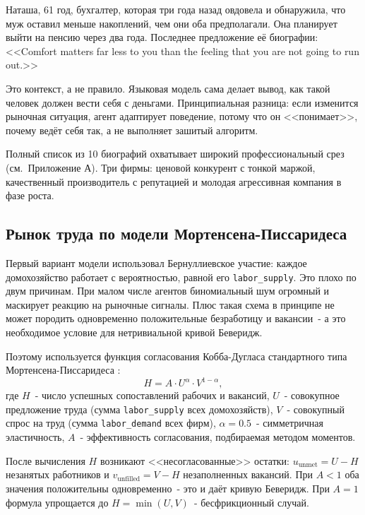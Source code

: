 \documentclass[12pt, a4paper]{article}
\begin{document}
Наташа, 61 год, бухгалтер, которая три года назад овдовела и обнаружила, что муж оставил меньше накоплений, чем они оба предполагали. Она планирует выйти на пенсию через два года. Последнее предложение её биографии: <<Comfort matters far less to you than the feeling that you are not going to run out.>>

Это контекст, а не правило. Языковая модель сама делает вывод, как такой человек должен вести себя с деньгами. Принципиальная разница: если изменится рыночная ситуация, агент адаптирует поведение, потому что он <<понимает>>, почему ведёт себя так, а не выполняет зашитый алгоритм.

Полный список из 10 биографий охватывает широкий профессиональный срез (см.\ Приложение А). Три фирмы: ценовой конкурент с тонкой маржой, качественный производитель с репутацией и молодая агрессивная компания в фазе роста.

\subsection{Рынок труда по модели Мортенсена-Писсаридеса}

Первый вариант модели использовал Бернуллиевское участие: каждое домохозяйство работает с вероятностью, равной его \texttt{labor\_supply}. Это плохо по двум причинам. При малом числе агентов биномиальный шум огромный и маскирует реакцию на рыночные сигналы. Плюс такая схема в принципе не может породить одновременно положительные безработицу и вакансии~- а это необходимое условие для нетривиальной кривой Беверидж.

Поэтому используется функция согласования Кобба-Дугласа стандартного типа Мортенсена-Писсаридеса \cite{mortensen1994}:
\begin{equation}
H = A \cdot U^{\alpha} \cdot V^{1-\alpha},
\end{equation}
где $H$~- число успешных сопоставлений рабочих и вакансий, $U$~- совокупное предложение труда (сумма \texttt{labor\_supply} всех домохозяйств), $V$~- совокупный спрос на труд (сумма \texttt{labor\_demand} всех фирм), $\alpha = 0.5$~- симметричная эластичность, $A$~- эффективность согласования, подбираемая методом моментов.

После вычисления $H$ возникают <<несогласованные>> остатки: $u_{\text{unmet}} = U - H$ незанятых работников и $v_{\text{unfilled}} = V - H$ незаполненных вакансий. При $A < 1$ оба значения положительны одновременно~- это и даёт кривую Беверидж. При $A = 1$ формула упрощается до $H = \min(U, V)$~- бесфрикционный случай.
\end{document}
